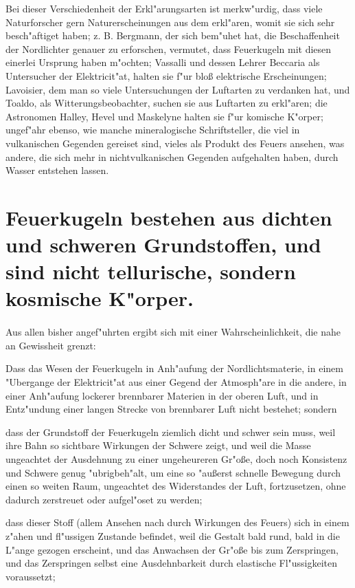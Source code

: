\documentclass[a4paper, 11pt, oneside, polutonikogreek, german]{article}
\begin{document}
Bei dieser Verschiedenheit der Erkl"arungsarten ist merkw"urdig, dass viele Naturforscher gern Naturerscheinungen aus dem erkl"aren, womit sie sich sehr besch"aftiget haben; z. B. Bergmann, der sich bem"uhet hat, die Beschaffenheit der Nordlichter genauer zu erforschen, vermutet, dass Feuerkugeln mit diesen einerlei Ursprung haben m"ochten; Vassalli und dessen Lehrer Beccaria als Untersucher der Elektricit"at, halten sie f"ur bloß elektrische Erscheinungen; Lavoisier, dem man so viele Untersuchungen der Luftarten zu verdanken hat, und Toaldo, als Witterungsbeobachter, suchen sie aus Luftarten zu erkl"aren; die Astronomen Halley, Hevel und Maskelyne halten sie f"ur komische K"orper; ungef"ahr ebenso, wie manche mineralogische Schriftsteller, die viel in vulkanischen Gegenden gereiset sind, vieles als Produkt des Feuers ansehen, was andere, die sich mehr in nichtvulkanischen Gegenden aufgehalten haben, durch Wasser entstehen lassen.
\clearpage
\section{Feuerkugeln bestehen aus dichten und schweren Grundstoffen, und sind nicht tellurische, sondern kosmische K"orper.}
\paragraph{}
Aus allen bisher angef"uhrten ergibt sich mit einer Wahrscheinlichkeit, die nahe an Gewissheit grenzt:

Dass das Wesen der Feuerkugeln in Anh"aufung der Nordlichtsmaterie, in einem "Ubergange der Elektricit"at aus einer Gegend der Atmosph"are in die andere, in einer Anh"aufung lockerer brennbarer Materien in der oberen Luft, und in Entz"undung einer langen Strecke von brennbarer Luft nicht bestehet; sondern

dass der Grundstoff der Feuerkugeln ziemlich dicht und schwer sein muss, weil ihre Bahn so sichtbare Wirkungen der Schwere zeigt, und weil die Masse ungeachtet der Ausdehnung zu einer ungeheureren Gr"oße, doch noch Konsistenz und Schwere genug "ubrigbeh"alt, um eine so "außerst schnelle Bewegung durch einen so weiten Raum, ungeachtet des Widerstandes der Luft, fortzusetzen, ohne dadurch zerstreuet oder aufgel"oset zu werden;

dass dieser Stoff (allem Ansehen nach durch Wirkungen des Feuers) sich in einem z"ahen und fl"ussigen Zustande befindet, weil die Gestalt bald rund, bald in die L"ange gezogen erscheint, und das Anwachsen der Gr"oße bis zum Zerspringen, und das Zerspringen selbst eine Ausdehnbarkeit durch elastische Fl"ussigkeiten voraussetzt;
\end{document}
